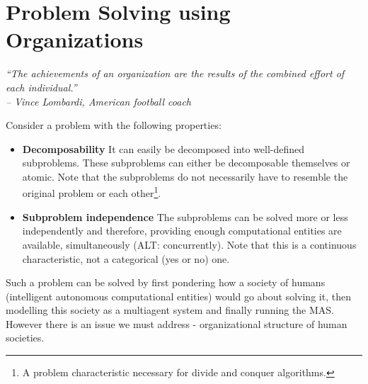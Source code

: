 
\chapter{Problem Solving using Organizations}

\begin{flushright}
\textit{``The achievements of an organization are the results of the combined effort of each individual.''}\\
\textit{-- Vince Lombardi, American football coach}
\end{flushright}

Consider a problem with the following properties:
\begin{itemize}
	\item \textbf{Decomposability} It can easily be decomposed into well-defined subproblems. These subproblems can either be decomposable themselves or atomic.
	Note that the subproblems do not necessarily have to resemble the original problem or each other\footnote{A problem characteristic necessary for divide and conquer algorithms.}. 
	\item \textbf{Subproblem independence} The subproblems can be solved more or less independently and therefore, providing enough computational entities are available, simultaneously (ALT: concurrently).
	Note that this is a continuous characteristic, not a categorical (yes or no) one.
\end{itemize}

Such a problem can be solved by first pondering how a society of humans (intelligent autonomous computational entities) would go about solving it, then modelling this society as a multiagent system and finally running the MAS.
However there is an issue we must address - organizational structure of human societies.

